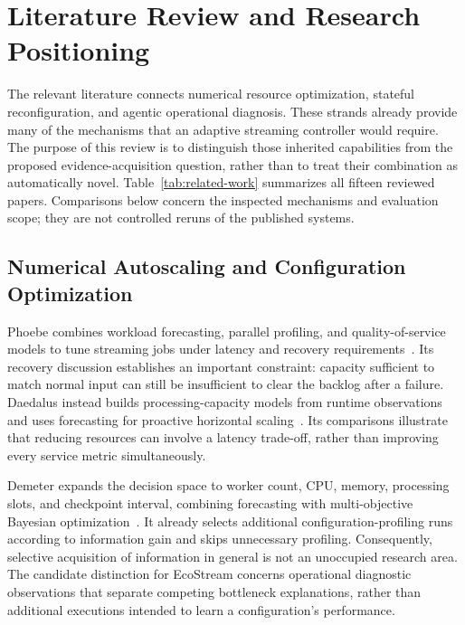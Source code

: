 \section{Literature Review and Research Positioning}
\label{sec:literature-review}
The relevant literature connects numerical resource optimization, stateful reconfiguration, and agentic operational diagnosis. These strands already provide many of the mechanisms that an adaptive streaming controller would require. The purpose of this review is to distinguish those inherited capabilities from the proposed evidence-acquisition question, rather than to treat their combination as automatically novel. Table~\ref{tab:related-work} summarizes all fifteen reviewed papers. Comparisons below concern the inspected mechanisms and evaluation scope; they are not controlled reruns of the published systems.

\subsection{Numerical Autoscaling and Configuration Optimization}
Phoebe combines workload forecasting, parallel profiling, and quality-of-service models to tune streaming jobs under latency and recovery requirements~\cite{geldenhuys2022phoebe}. Its recovery discussion establishes an important constraint: capacity sufficient to match normal input can still be insufficient to clear the backlog after a failure. Daedalus instead builds processing-capacity models from runtime observations and uses forecasting for proactive horizontal scaling~\cite{pfister2024daedalus}. Its comparisons illustrate that reducing resources can involve a latency trade-off, rather than improving every service metric simultaneously.

Demeter expands the decision space to worker count, CPU, memory, processing slots, and checkpoint interval, combining forecasting with multi-objective Bayesian optimization~\cite{geldenhuys2024demeter}. It already selects additional configuration-profiling runs according to information gain and skips unnecessary profiling. Consequently, selective acquisition of information in general is not an unoccupied research area. The candidate distinction for EcoStream concerns operational diagnostic observations that separate competing bottleneck explanations, rather than additional executions intended to learn a configuration's performance.


